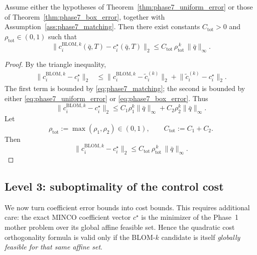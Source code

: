\begin{corollary}
	\label{cor:phase7_actual_convergence}
	Assume either the hypotheses of Theorem~\ref{thm:phase7_uniform_error} or those of Theorem~\ref{thm:phase7_box_error}, together with Assumption~\ref{ass:phase7_matching}.
	Then there exist constants \(C_{\mathrm{tot}}>0\) and \(\rho_{\mathrm{tot}}\in(0,1)\) such that
	\begin{equation}
		\label{eq:phase7_actual_error}
		\bigl\|
		c_i^{\mathrm{BLOM},k}(\bar q,T)-c_i^\star(\bar q,T)
		\bigr\|_2
		\le
		C_{\mathrm{tot}}\,\rho_{\mathrm{tot}}^{\,k}\,\|\bar q\|_\infty.
	\end{equation}
\end{corollary}

\begin{proof}
	By the triangle inequality,
	\begin{align*}
		\bigl\|
		c_i^{\mathrm{BLOM},k}-c_i^\star
		\bigr\|_2
		&\le
		\bigl\|
		c_i^{\mathrm{BLOM},k}-\tilde c_i^{(k)}
		\bigr\|_2
		+
		\bigl\|
		\tilde c_i^{(k)}-c_i^\star
		\bigr\|_2.
	\end{align*}
	The first term is bounded by \eqref{eq:phase7_matching}; the second is bounded by either \eqref{eq:phase7_uniform_error} or \eqref{eq:phase7_box_error}.
	Thus
	\[
	\bigl\|
	c_i^{\mathrm{BLOM},k}-c_i^\star
	\bigr\|_2
	\le
	C_1\rho_1^k\|\bar q\|_\infty + C_2\rho_2^k\|\bar q\|_\infty.
	\]
	Let
	\[
	\rho_{\mathrm{tot}}:=\max(\rho_1,\rho_2)\in(0,1),
	\qquad
	C_{\mathrm{tot}}:=C_1+C_2.
	\]
	Then
	\[
	\bigl\|
	c_i^{\mathrm{BLOM},k}-c_i^\star
	\bigr\|_2
	\le
	C_{\mathrm{tot}}\,\rho_{\mathrm{tot}}^{\,k}\,\|\bar q\|_\infty.
	\]
\end{proof}

\subsection{Level 3: suboptimality of the control cost}
\label{subsec:phase7_cost_bound}

We now turn coefficient error bounds into cost bounds.
This requires additional care: the exact MINCO coefficient vector \(c^\star\) is the minimizer of the Phase~1 mother problem over its global affine feasible set.
Hence the quadratic cost orthogonality formula is valid only if the BLOM-\(k\) candidate is itself \emph{globally feasible for that same affine set}.


